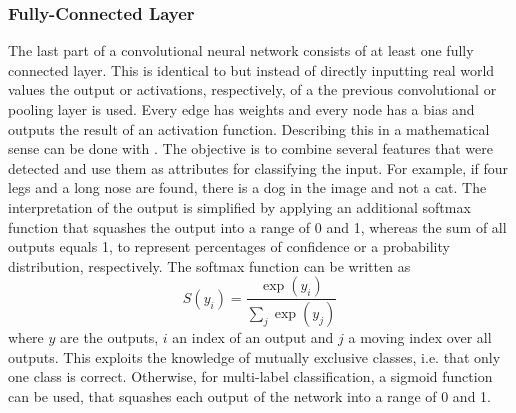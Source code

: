 \subsubsection{Fully-Connected Layer}
\label{sec:cnn-fully-connected}
The last part of a convolutional neural network consists of at least one fully connected layer.
This is identical to  but instead of directly inputting real world values the output or activations, respectively, of a the previous convolutional or pooling layer is used.
Every edge has weights and every node has a bias and outputs the result of an activation function.
Describing this in a mathematical sense can be done with .
The objective is to combine several features that were detected and use them as attributes for classifying the input.
For example, if four legs and a long nose are found, there is a dog in the image and not a cat.
The interpretation of the output is simplified by applying an additional softmax function that squashes the output into a range of 0 and 1, whereas the sum of all outputs equals 1, to represent percentages of confidence or a probability distribution, respectively\cite{Bishop2006}.
The softmax function can be written as
\begin{equation}
	\label{eq:softmax}
	S(y_i) = \frac{\exp(y_i)}{\sum_{j} \exp(y_j)}
\end{equation}
where $y$ are the outputs, $i$ an index of an output and $j$ a moving index over all outputs.
This exploits the knowledge of mutually exclusive classes, i.e. that only one class is correct.
Otherwise, for multi-label classification, a sigmoid function can be used, that squashes each output of the network into a range of 0 and 1.